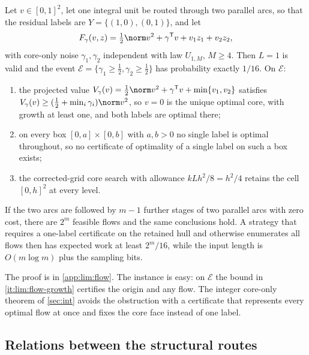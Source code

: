 \begin{proposition}\label{prop:lim:flow}
Let $v\in[0,1]^2$, let one integral unit be routed through two parallel
arcs, so that the residual labels are $Y=\{(1,0),(0,1)\}$, and let
\[
 F_\gamma(v,z)=\tfrac12\norm v^2+\gamma^{\mathsf T}v+v_1z_1+v_2z_2 ,
\]
with core-only noise $\gamma_1,\gamma_2$ independent with law $U_{1,M}$,
$M\ge4$. Then $L=1$ is valid and the event
$\mathcal E=\{\gamma_1\ge\frac12,\gamma_2\ge\frac12\}$ has probability
exactly $1/16$. On $\mathcal E$:
\begin{enumerate}[label=(\alph*)]
\item\label{it:lim:flow-growth} the projected value
$V_\gamma(v)=\frac12\norm v^2+\gamma^{\mathsf T}v+\min\{v_1,v_2\}$
satisfies $V_\gamma(v)\ge(\frac12+\min_i\gamma_i)\norm v^2$, so $v=0$ is
the unique optimal core, with growth at least one, and both labels are
optimal there;
\item\label{it:lim:flow-box} on every box $[0,a]\times[0,b]$ with $a,b>0$ no
single label is optimal throughout, so no certificate of optimality of a
single label on such a box exists;
\item\label{it:lim:flow-search} the corrected-grid core search with
allowance $kLh^2/8=h^2/4$ retains the cell $[0,h]^2$ at every level.
\end{enumerate}
If the two arcs are followed by $m-1$ further stages of two parallel arcs
with zero cost, there are $2^m$ feasible flows and the same conclusions hold.
A strategy that requires a one-label certificate on the retained hull and
otherwise enumerates all flows then has expected work at least $2^m/16$,
while the input length is $O(m\log m)$ plus the sampling bits.
\end{proposition}

The proof is in \cref{app:lim:flow}. The instance is easy: on $\mathcal E$
the bound in \ref{it:lim:flow-growth} certifies the origin and any flow. The
integer core-only theorem of \cref{sec:int} avoids the obstruction with a
certificate that represents every optimal flow at once and fixes the core
face instead of one label.

\subsection{Relations between the structural routes}\label{sec:lim:rank}

